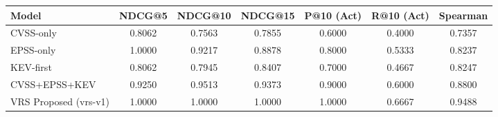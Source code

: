 \begin{table}[h]
\centering
\begin{tabular}{lcccccc}
\hline
Model & NDCG@5 & NDCG@10 & NDCG@15 & P@10 (Act) & R@10 (Act) & Spearman \\
\hline
CVSS-only & 0.8062 & 0.7563 & 0.7855 & 0.6000 & 0.4000 & 0.7357 \\
EPSS-only & 1.0000 & 0.9217 & 0.8878 & 0.8000 & 0.5333 & 0.8237 \\
KEV-first & 0.8062 & 0.7945 & 0.8407 & 0.7000 & 0.4667 & 0.8247 \\
CVSS+EPSS+KEV & 0.9250 & 0.9513 & 0.9373 & 0.9000 & 0.6000 & 0.8800 \\
VRS Proposed (vrs-v1) & 1.0000 & 1.0000 & 1.0000 & 1.0000 & 0.6667 & 0.9488 \\
\hline
\end{tabular}
\end{table}
